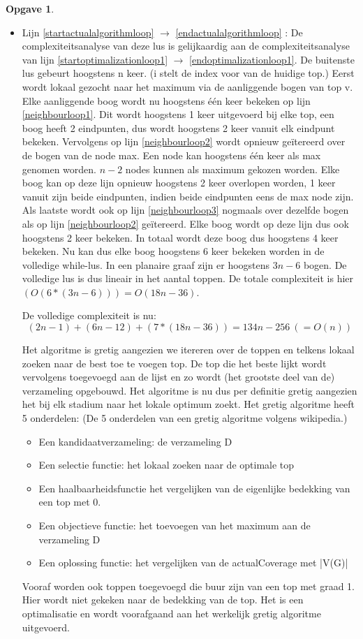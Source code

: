 \documentclass[11pt, a4paper, table]{article}
\theoremstyle{definition}
\newtheorem{opgave}{Opgave}
\theoremstyle{definition}
\theoremstyle{definition}
\begin{document}
\begin{opgave}
\begin{itemize}
			\item Lijn \ref{startactualalgorithmloop} $\rightarrow$ \ref{endactualalgorithmloop} : De complexiteitsanalyse van deze lus is gelijkaardig aan de complexiteitsanalyse van lijn \ref{startoptimalizationloop1} $\rightarrow$ \ref{endoptimalizationloop1}. De buitenste lus gebeurt hoogstens n keer. (i stelt de index voor van de huidige top.) Eerst wordt lokaal gezocht naar het maximum via de aanliggende bogen van top v. Elke aanliggende boog wordt nu hoogstens \'{e}\'{e}n keer bekeken op lijn \ref{neighbourloop1}. Dit wordt hoogstens 1 keer uitgevoerd bij elke top, een boog heeft 2 eindpunten, dus wordt hoogstens 2 keer vanuit elk eindpunt bekeken. Vervolgens op lijn \ref{neighbourloop2} wordt opnieuw ge\"{i}tereerd over de bogen van de node max. Een node kan hoogstens \'{e}\'{e}n keer als max genomen worden. $n-2$ nodes kunnen als maximum gekozen worden. Elke boog kan op deze lijn opnieuw hoogstens 2 keer overlopen worden, 1 keer vanuit zijn beide eindpunten, indien beide eindpunten eens de max node zijn. Als laatste wordt ook op lijn \ref{neighbourloop3} nogmaals over dezelfde bogen als op lijn \ref{neighbourloop2} ge\"{i}tereerd. Elke boog wordt op deze lijn dus ook hoogstens 2 keer bekeken. In totaal wordt deze boog dus hoogstens 4 keer bekeken. Nu kan dus elke boog hoogstens 6 keer bekeken worden in de volledige while-lus. In een planaire graaf zijn er hoogstens $3n-6$ bogen. De volledige lus is dus lineair in het aantal toppen. De totale complexiteit is hier $(O(6*(3n-6)))=O(18n-36)$.
		
		
		De volledige complexiteit is nu: 
		\[(2n-1)+(6n-12)+(7*(18n-36))=134n-256\ (=O(n))\]
		
			Het algoritme is gretig aangezien we itereren over de toppen en telkens lokaal zoeken naar de best toe te voegen top. De top die het beste lijkt wordt vervolgens toegevoegd aan de lijst en zo wordt (het grootste deel van de) verzameling opgebouwd. Het algoritme is nu dus per definitie gretig aangezien het bij elk stadium naar het lokale optimum zoekt.
			Het gretig algoritme heeft 5 onderdelen: (De 5 onderdelen van een gretig algoritme volgens wikipedia.)
			\begin{itemize}
				\item Een kandidaatverzameling: de verzameling D
				\item Een selectie functie: het lokaal zoeken naar de optimale top
				\item Een haalbaarheidsfunctie het vergelijken van de eigenlijke bedekking van een top met 0. 
				\item Een objectieve functie: het toevoegen van het maximum aan de verzameling D
				\item Een oplossing functie: het vergelijken van de actualCoverage met |V(G)|
			\end{itemize} 
			 Vooraf worden ook toppen toegevoegd die buur zijn van een top met graad 1. Hier wordt niet gekeken naar de bedekking van de top. Het is een optimalisatie en wordt voorafgaand aan het werkelijk gretig algoritme uitgevoerd. 
		\end{itemize}
\end{opgave}
\end{document}
